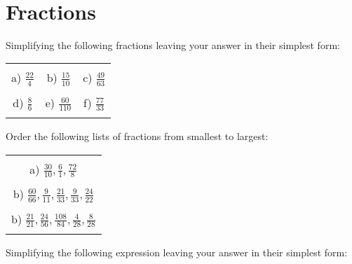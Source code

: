 \documentclass[12pt]{article}
\begin{document}
\pagestyle{fancy}
\\
\fancyfoot{} 
\section{Fractions}
Simplifying the following fractions leaving your answer in their simplest form:
\begin{table}[h!]
\centering
\begin{tabular}{c c c}
\hspace{2cm} & \hspace{6cm} & \hspace{4cm}\\
a) $\frac{22}{4}$ & b) $\frac{15}{10}$ & c) $\frac{49}{63}$\\ \\
d) $\frac{8}{6}$ & e) $\frac{60}{110}$ & f) $\frac{77}{33}$\\ \\
\end{tabular}
\end{table}
\newline
Order the following lists of fractions from smallest to largest:
\begin{table}[h!]
\centering
\begin{tabular}{c}
\hspace{4cm}\\
a) $\frac{30}{10}, \frac{6}{1}, \frac{72}{8}$\\ \\
b) $\frac{60}{66}, \frac{9}{11}, \frac{21}{33}, \frac{9}{33}, \frac{24}{22}$\\ \\
b) $\frac{21}{21}, \frac{24}{56}, \frac{108}{84}, \frac{4}{28}, \frac{8}{28}$\\ \\
\end{tabular}
\end{table}
\newline
Simplifying the following expression leaving your answer in their simplest form:
\end{document}
